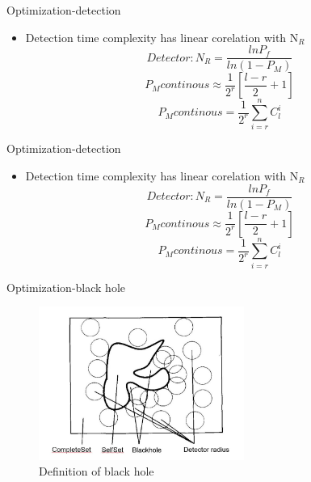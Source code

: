 \begin{frame}{Optimization-detection}
  \begin{itemize}
  \item{
     Detection time complexity has linear corelation with N$_R$\\
  \begin{equation}
     Detector:N_R=\frac{lnP_f}{ln(1-P_M)}
  \end{equation}  
  \begin{equation}
     P_Mcontinous \approx \frac{1}{2^r}[\frac{l-r}{2}+1]
  \end{equation}
  \begin{equation}
     P_Mcontinous = \frac{1}{2^r}\sum_{i=r}^{n}C_l^i
  \end{equation}
 }
  \end{itemize}
\end{frame}

\begin{frame}{Optimization-detection}
  \begin{itemize}
  \item{
     Detection time complexity has linear corelation with N$_R$\\
  \begin{equation}
     Detector:N_R=\frac{lnP_f}{ln(1-P_M)}
  \end{equation}  
  \begin{equation}
     P_Mcontinous \approx \frac{1}{2^r}[\frac{l-r}{2}+1]
  \end{equation}
  \begin{equation}
     P_Mcontinous = \frac{1}{2^r}\sum_{i=r}^{n}C_l^i
  \end{equation}
 }
  \end{itemize}
\end{frame}

\begin{frame}{Optimization-black hole}
  \begin{figure}[hb]
  \centering
  \includegraphics[width=0.6\textwidth]{img/blackhole.jpg}
  \caption{Definition of black hole}
  \end{figure}
\end{frame}





